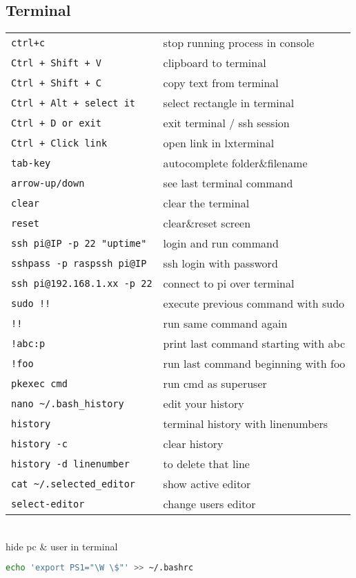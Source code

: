 \documentclass[fontsize=6pt,paper=a4,paper=landscape,twoside=false,parskip=half,
headings=small,numbers=withenddot,usegeometry=true,english]{scrartcl}
\begin{document}
\begin{multicols}{4}
{	\subsection{Terminal}\label{sec:terminal}
	\begin{tabular}{@{}ll@{}}\toprule
		\texttt{ctrl+c}  &  stop running process in console\\
		\texttt{Ctrl + Shift + V}  &  clipboard to terminal\\
		\texttt{Ctrl + Shift + C}  &  copy text from terminal\\
		\texttt{Ctrl + Alt + select it}  &  select rectangle in terminal\\
		\texttt{Ctrl + D or exit}  &  exit terminal / ssh session\\
		\texttt{Ctrl + Click link}  &  open link in lxterminal\\
		\texttt{tab-key}  &  autocomplete folder\&filename\\
		\texttt{arrow-up/down}  &  see last terminal command\\
		\texttt{clear}  &  clear the terminal\\
		\texttt{reset}  &  clear\&reset screen\\
		\texttt{ssh pi@IP -p 22 "uptime"}  &  login and run command\\
		\texttt{sshpass -p \textquotesingle rasp\textquotesingle ssh pi@IP}  &  ssh login with password\\
		\texttt{ssh pi@192.168.1.xx -p 22}  &  connect to pi over terminal\\
		\texttt{sudo !!}  &  execute previous command with sudo\\
		\texttt{!!}  &  run same command again\\
		\texttt{!abc:p}  &  print last command starting with abc\\
		\texttt{!foo}  &  run last command beginning with foo\\
		\texttt{pkexec cmd}  &  run cmd as superuser\\	
		\texttt{nano \textasciitilde/.bash\_history}  &  edit your history\\	
		\texttt{history}  &  terminal history with linenumbers\\
		\texttt{history -c}  &  clear history\\
		\texttt{history -d linenumber}  &  to delete that line\\
		\texttt{cat \textasciitilde/.selected\_editor}  &  show active editor\\
		\texttt{select-editor}  &  change users editor\\
		\bottomrule
	\end{tabular}\\
	hide pc \& user in terminal\\
	\begin{lstlisting}[language=bash]
echo 'export PS1="\W \$"' >> ~/.bashrc
	\end{lstlisting}
}


\end{multicols}
\end{document}
